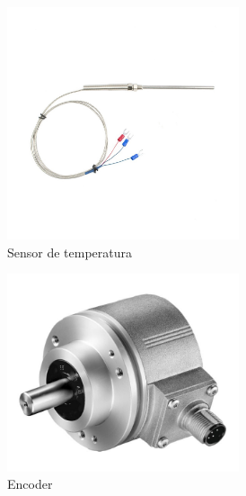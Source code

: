 \documentclass{article}
\begin{document}
\begin{figure}[ht]
    \centering
    \begin{subfigure}[b]{0.3\textwidth}
      \centering
      \includegraphics[width=0.75\textwidth]{Alan6.jpg}
      \caption{Sensor de temperatura}
    \end{subfigure}
    \begin{subfigure}[b]{0.3\textwidth}
      \centering
      \includegraphics[width=0.75\textwidth]{Alan5.jpg}
      \caption{Encoder}
    \end{subfigure}
    \begin{subfigure}[b]{0.3\textwidth}
      \centering

\end{subfigure}
\end{figure}
\end{document}
